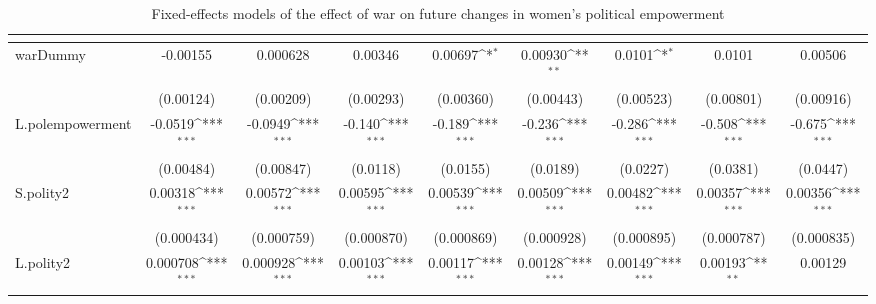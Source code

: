 \begin{table}[htbp]\centering
\def\sym#1{\ifmmode^{#1}\else\(^{#1}\)\fi}
\caption{Fixed-effects models of the effect of war on future changes in women's political empowerment\label{tab2}}
\begin{tabular}{l*{8}{c}}
\hline\hline
                    &&&&&&&&\\
\hline
warDummy            &    -0.00155         &    0.000628         &     0.00346         &     0.00697\sym{*}  &     0.00930\sym{**} &      0.0101\sym{*}  &      0.0101         &     0.00506         \\
                    &   (0.00124)         &   (0.00209)         &   (0.00293)         &   (0.00360)         &   (0.00443)         &   (0.00523)         &   (0.00801)         &   (0.00916)         \\
[1em]
L.polempowerment    &     -0.0519\sym{***}&     -0.0949\sym{***}&      -0.140\sym{***}&      -0.189\sym{***}&      -0.236\sym{***}&      -0.286\sym{***}&      -0.508\sym{***}&      -0.675\sym{***}\\
                    &   (0.00484)         &   (0.00847)         &    (0.0118)         &    (0.0155)         &    (0.0189)         &    (0.0227)         &    (0.0381)         &    (0.0447)         \\
[1em]
S.polity2           &     0.00318\sym{***}&     0.00572\sym{***}&     0.00595\sym{***}&     0.00539\sym{***}&     0.00509\sym{***}&     0.00482\sym{***}&     0.00357\sym{***}&     0.00356\sym{***}\\
                    &  (0.000434)         &  (0.000759)         &  (0.000870)         &  (0.000869)         &  (0.000928)         &  (0.000895)         &  (0.000787)         &  (0.000835)         \\
[1em]
L.polity2           &    0.000708\sym{***}&    0.000928\sym{***}&     0.00103\sym{***}&     0.00117\sym{***}&     0.00128\sym{***}&     0.00149\sym{***}&     0.00193\sym{**} &     0.00129         \\

\end{tabular}
\end{table}
